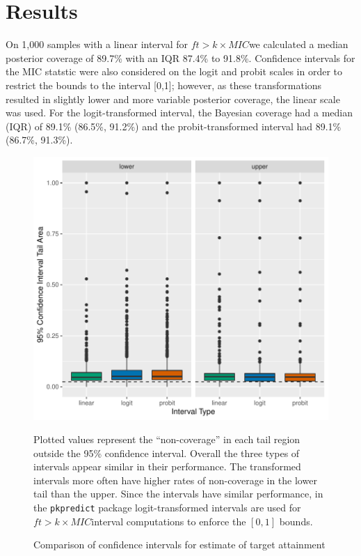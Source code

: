 \documentclass{article}\usepackage[]{graphicx}\usepackage[]{color}
\newcommand{\mic}{$ft > k \times MIC$}
\begin{document}
\section{Results}




On 1,000 samples with a linear interval for \mic we calculated a median posterior coverage of 89.7\% with an IQR 87.4\% to 91.8\%. Confidence intervals for the MIC statstic were also considered on the logit and probit scales in order to restrict the bounds to the interval [0,1]; however, as these transformations resulted in slightly lower and more variable posterior coverage, the linear scale was used. For the logit-transformed interval, the Bayesian coverage had a median (IQR) of 89.1\% (86.5\%, 91.2\%) and the probit-transformed interval had 89.1\% (86.7\%, 91.3\%).








\begin{figure}
\caption{Comparison of confidence intervals for estimate of target attainment}

\includegraphics{intervalcomparison.pdf}

\footnotesize
Plotted values represent the ``non-coverage'' in each tail region outside the 95\% confidence interval. Overall the three types of intervals appear similar in their performance. The transformed intervals more often have higher rates of non-coverage in the lower tail than the upper. Since the intervals have similar performance, in the \texttt{pkpredict} package logit-transformed intervals are used for \mic interval computations to enforce the $[0,1]$ bounds.
\end{figure}
\end{document}
